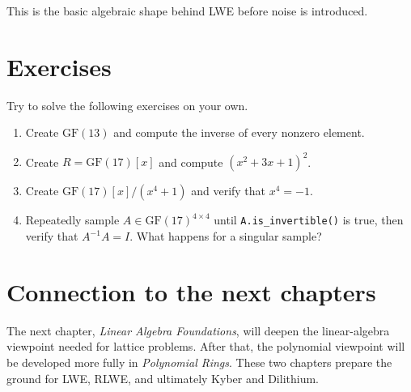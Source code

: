 This is the basic algebraic shape behind LWE before noise is introduced.

\section{Exercises}
Try to solve the following exercises on your own.

\begin{enumerate}
  \item Create $\mathrm{GF}(13)$ and compute the inverse of every nonzero element.
  \item Create $R = \mathrm{GF}(17)[x]$ and compute $(x^2 + 3x + 1)^2$.
  \item Create $\mathrm{GF}(17)[x]/(x^4 + 1)$ and verify that $x^4 = -1$.
  \item Repeatedly sample $A \in \mathrm{GF}(17)^{4 \times 4}$ until \texttt{A.is\_invertible()} is true, then verify that $A^{-1}A = I$. What happens for a singular sample?
\end{enumerate}

\section{Connection to the next chapters}
The next chapter, \emph{Linear Algebra Foundations}, will deepen the linear-algebra viewpoint needed for lattice problems. After that, the polynomial viewpoint will be developed more fully in \emph{Polynomial Rings}. These two chapters prepare the ground for LWE, RLWE, and ultimately Kyber and Dilithium.

\printbibliography[heading=chapterrefs]
